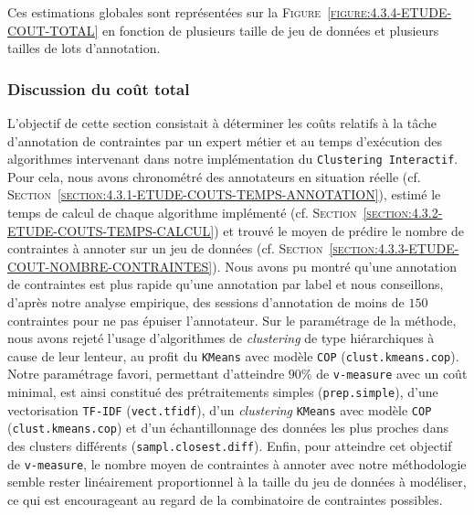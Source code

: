 			Ces estimations globales sont représentées sur la \textsc{Figure~\ref{figure:4.3.4-ETUDE-COUT-TOTAL}} en fonction de plusieurs taille de jeu de données et plusieurs tailles de lots d'annotation.

		\subsubsection{Discussion du coût total}
		
			L'objectif de cette section consistait à déterminer les coûts relatifs à la tâche d'annotation de contraintes par un expert métier et au temps d'exécution des algorithmes intervenant dans notre implémentation du \texttt{Clustering Interactif}.
			Pour cela, nous avons chronométré des annotateurs en situation réelle (cf. \textsc{Section~\ref{section:4.3.1-ETUDE-COUTS-TEMPS-ANNOTATION}}), estimé le temps de calcul de chaque algorithme implémenté (cf. \textsc{Section~\ref{section:4.3.2-ETUDE-COUTS-TEMPS-CALCUL}}) et trouvé le moyen de prédire le nombre de contraintes à annoter sur un jeu de données (cf. \textsc{Section~\ref{section:4.3.3-ETUDE-COUT-NOMBRE-CONTRAINTES}}).
			Nous avons pu montré qu'une annotation de contraintes est plus rapide qu'une annotation par label et nous conseillons, d'après notre analyse empirique, des sessions d'annotation de moins de $150$ contraintes pour ne pas épuiser l'annotateur.
			Sur le paramétrage de la méthode, nous avons rejeté l'usage d'algorithmes de \textit{clustering} de type hiérarchiques à cause de leur lenteur, au profit du \texttt{KMeans} avec modèle \texttt{COP} (\texttt{clust.kmeans.cop}).
			Notre paramétrage favori, permettant d'atteindre $90$\% de \texttt{v-measure} avec un coût minimal, est ainsi constitué des prétraitements simples (\texttt{prep.simple}), d'une vectorisation \texttt{TF-IDF} (\texttt{vect.tfidf}), d'un \textit{clustering} \texttt{KMeans} avec modèle \texttt{COP} (\texttt{clust.kmeans.cop}) et d'un échantillonnage des données les plus proches dans des clusters différents (\texttt{sampl.closest.diff}).
			Enfin, pour atteindre cet objectif de \texttt{v-measure}, le nombre moyen de contraintes à annoter avec notre méthodologie semble rester linéairement proportionnel à la taille du jeu de données à modéliser, ce qui est encourageant au regard de la combinatoire de contraintes possibles.
			\\
			
